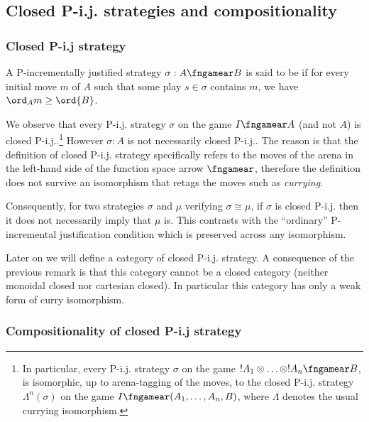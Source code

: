 \subsection{Closed P-i.j. strategies and compositionality}

\subsubsection{Closed P-i.j strategy}

\begin{definition}
\label{def:safe_strategy}
A P-incrementally justified strategy $\sigma : A \fngamear B$ is said to be  if for
every initial move $m$ of $A$ such that some play $s\in\sigma$ contains $m$, we have $\ord_A{m} \geq \ord{B}$. 
\end{definition}
We observe that every P-i.j. strategy $\sigma$ on the game $I \fngamear A$ (and not $A$) is closed P-i.j..\footnote{In particular, every P-i.j. strategy $\sigma$ on the game $!A_1 \otimes \ldots \otimes !A_n \fngamear B$, is isomorphic, up to arena-tagging of the moves, to the closed P-i.j. strategy $\Lambda^n(\sigma)$ on the game $I \fngamear (A_1,\ldots,A_n,B)$, where $\Lambda$ denotes the usual currying isomorphism.}
However $\sigma : A$ is not necessarily closed P-i.j.. The reason is that the definition of closed P-i.j. strategy specifically refers to the moves of  the arena in the left-hand side of the function space arrow $\fngamear$, therefore the definition does not survive an isomorphism that retags the moves such as {\it currying}.

Consequently, for two strategies $\sigma$ and $\mu$ verifying $\sigma \cong \mu$, if $\sigma$ is closed P-i.j. then it does not necessarily imply that $\mu$ is. This contrasts with the ``ordinary'' P-incremental justification condition which is preserved across any isomorphism.

Later on we will define a category of closed P-i.j. strategy. A consequence of the previous remark is that this category cannot be a closed category (neither monoidal closed nor cartesian closed).
In particular this category has only a weak form of curry isomorphism.

\subsubsection{Compositionality of closed P-i.j strategy}

